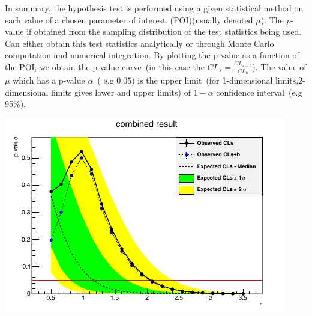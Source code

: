 \par
In summary, the hypothesis test is performed using a given statistical method on each value of a chosen parameter of interest~(POI)(usually denoted $\mu$). The $p$-value if obtained from the sampling distribution of the test statistics being used. Can either obtain this test statistics analytically or through Monte Carlo computation and  numerical integration. By plotting the p-value as a function of the POI, we obtain the p-value curve~(in this case the $CL_{s} = \frac{CL_{s+b}}{CL_{b}}$).
The value of $\mu$ which has a p-value $\alpha$~( e.g $0.05$) is the upper limit~(for 1-dimensional limits,2-dimensional limits gives lower and upper limits) of $1 - \alpha$  confidence interval~(e.g 95\%).
\begin{center}
\centering
\includegraphics[scale=1.0]{THESISPLOTS/Limits_CLs.png}
\label{fig:LIMITS_CLS}
\end{center}


